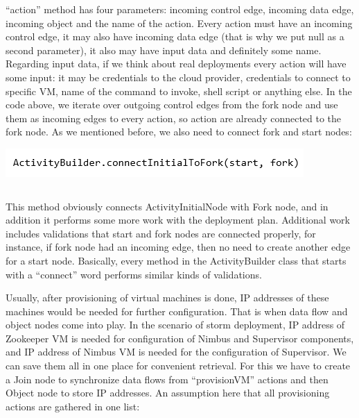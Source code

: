 \noindent ``action'' method has four parameters: incoming control edge, incoming data edge, incoming object and the name of the action. Every action must have an incoming control edge, it may also have incoming data edge (that is why we put null as a second parameter), it also may have input data and definitely some name. Regarding input data, if we think about real deployments every action will have some input: it may be credentials to the cloud provider, credentials to connect to specific VM, name of the command to invoke, shell script or anything else. In the code above, we iterate over outgoing control edges from the fork node and use them as incoming edges to every action, so action are already connected to the fork node. As we mentioned before, we also need to connect fork and start nodes:

\begin{center}
	\includegraphics{./Figures/Connect}
	\begin{lstlisting}[mathescape,caption={Connecting two nodes},label={lst:7}]
	\end{lstlisting}
\end{center} 

\noindent This method obviously connects ActivityInitialNode with Fork node, and in addition it performs some more work with the deployment plan. Additional work includes validations that start and fork nodes are connected properly, for instance, if fork node had an incoming edge, then no need to create another edge for a start node. Basically, every method in the ActivityBuilder class that starts with a ``connect'' word performs similar kinds of validations.

\noindent 

\noindent Usually, after provisioning of virtual machines is done, IP addresses of these machines would be needed for further configuration. That is when data flow and object nodes come into play. In the scenario of storm deployment, IP address of Zookeeper VM is needed for configuration of Nimbus and Supervisor components, and IP address of Nimbus VM is needed for the configuration of Supervisor. We can save them all in one place for convenient retrieval. For this we have to create a Join node to synchronize data flows from ``provisionVM'' actions and then Object node to store IP addresses. An assumption here that all provisioning actions are gathered in one list:

